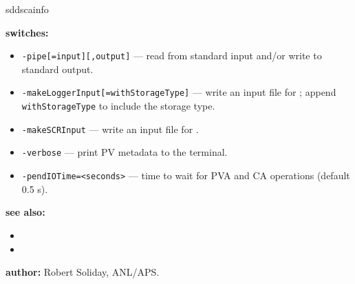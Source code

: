 \begin{sddsprog}{sddscainfo}
\item \textbf{switches:}
\begin{itemize}
  \item {\tt -pipe[=input][,output]} --- read from standard input and/or write to standard output.
  \item {\tt -makeLoggerInput[=withStorageType]} --- write an input file for ; append \newline
    \verb|withStorageType| to include the storage type.
  \item {\tt -makeSCRInput} --- write an input file for .
  \item {\tt -verbose} --- print PV metadata to the terminal.
  \item {\tt -pendIOTime=<seconds>} --- time to wait for PVA and CA operations (default 0.5 s).
\end{itemize}

\item \textbf{see also:}
\begin{itemize}
  \item {}
  \item {}
\end{itemize}

\item \textbf{author:} Robert Soliday, ANL/APS.
\end{sddsprog}
